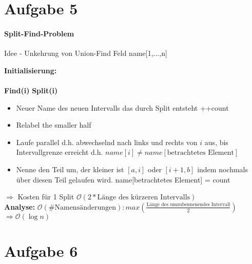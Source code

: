 \documentclass[10pt,a4paper]{article}
\begin{document}
\section*{Aufgabe 5}
\paragraph{Split-Find-Problem}

Idee - Unkehrung von Union-Find
Feld name[1,...,n]

\begin{algorithm}[H]
	\textbf{Initialisierung:} \\
	~\\
	\textbf{Find(i)}
	\textbf{Split(i)}
	\begin{itemize}
		\item Neuer Name des neuen Intervalls das durch Split entsteht ++count
		\item Relabel the smaller half
		\item Laufe parallel d.h. abwechselnd nach links und rechts von $i$ aus, bis Intervallgrenze erreicht d.h. $name[i]\neq name[\text{betrachtetes Element}]$
		\item Nenne den Teil um, der kleiner ist $[a,i]$ oder $[i+1,b]$ indem nochmals über diesen Teil gelaufen wird. name[betrachtetes Element] = count
	\end{itemize}
\end{algorithm}
	\begin{center}
		\resizebox{.5\columnwidth}{!}{
			
		}
	\end{center}
	$\Rightarrow$ Kosten für 1 Split $\mathcal{O}(2*\text{Länge des kürzeren Intervalls})$ \\
	\textbf{Analyse:} $\mathcal{O}(\#\text{Namensänderungen}): max(\frac{\text{Länge des umzubennenendes Intervall}}{2})$ $\Rightarrow\mathcal{O}(\log n)$




\section*{Aufgabe 6}
\end{document}
